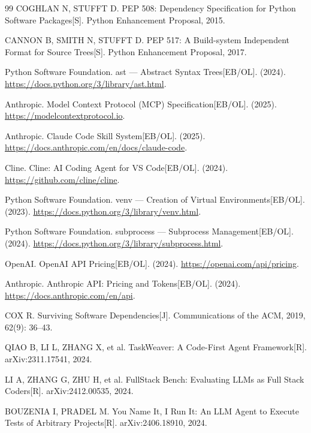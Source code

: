 \documentclass[10pt]{ctexart}
\begin{document}
\begin{thebibliography}{99}
COGHLAN N, STUFFT D.
 PEP 508: Dependency Specification for Python Software Packages[S]. Python Enhancement Proposal, 2015.

CANNON B, SMITH N, STUFFT D.
 PEP 517: A Build-system Independent Format for Source Trees[S]. Python Enhancement Proposal, 2017.

Python Software Foundation.
 ast --- Abstract Syntax Trees[EB/OL]. (2024). \url{https://docs.python.org/3/library/ast.html}.

Anthropic.
 Model Context Protocol (MCP) Specification[EB/OL]. (2025). \url{https://modelcontextprotocol.io}.

Anthropic.
 Claude Code Skill System[EB/OL]. (2025). \url{https://docs.anthropic.com/en/docs/claude-code}.

Cline.
 Cline: AI Coding Agent for VS Code[EB/OL]. (2024). \url{https://github.com/cline/cline}.

Python Software Foundation.
 venv --- Creation of Virtual Environments[EB/OL]. (2023). \url{https://docs.python.org/3/library/venv.html}.

Python Software Foundation.
 subprocess --- Subprocess Management[EB/OL]. (2024). \url{https://docs.python.org/3/library/subprocess.html}.

OpenAI.
 OpenAI API Pricing[EB/OL]. (2024). \url{https://openai.com/api/pricing}.

Anthropic.
 Anthropic API: Pricing and Tokens[EB/OL]. (2024). \url{https://docs.anthropic.com/en/api}.

COX R.
 Surviving Software Dependencies[J]. Communications of the ACM, 2019, 62(9): 36--43.

QIAO B, LI L, ZHANG X, et al.
 TaskWeaver: A Code-First Agent Framework[R]. arXiv:2311.17541, 2024.

LI A, ZHANG G, ZHU H, et al.
 FullStack Bench: Evaluating LLMs as Full Stack Coders[R]. arXiv:2412.00535, 2024.

BOUZENIA I, PRADEL M.
 You Name It, I Run It: An LLM Agent to Execute Tests of Arbitrary Projects[R]. arXiv:2406.18910, 2024.

\end{thebibliography}
\end{document}
